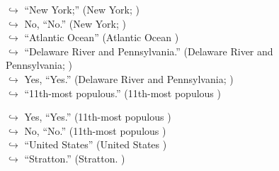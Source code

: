 \documentclass[11pt,a4paper, onecolumn]{article}
\begin{document}
\begin{figure}[t]
\begin{tcolorbox}[boxsep=0pt,left=5pt,right=0pt,top=2pt,colback = yellow!5]
\begin{dialogue}
\colorbox{pink!25}{$\hookrightarrow$}
{ ``New York;'' (New York; ) }
\\
\colorbox{pink!25}{$\hookrightarrow$}
\colorbox{red!25}{No,}
{ ``No.'' (New York; ) }
\\
\colorbox{pink!25}{$\hookrightarrow$}
{ ``Atlantic Ocean'' (Atlantic Ocean ) }
\\
\colorbox{pink!25}{$\hookrightarrow$}
{ ``Delaware River and Pennsylvania.'' (Delaware River and Pennsylvania; ) }
\\
\colorbox{pink!25}{$\hookrightarrow$}
\colorbox{red!25}{Yes,}
{ ``Yes.'' (Delaware River and Pennsylvania; ) }
\\
\colorbox{pink!25}{$\hookrightarrow$}
{ ``11th-most populous.'' (11th-most populous ) }
 \end{dialogue}\end{tcolorbox}\end{figure}\begin{figure}[t] \small \begin{tcolorbox}[boxsep=0pt,left=5pt,right=0pt,top=2pt,colback = yellow!5] \begin{dialogue}
 \small 
\colorbox{pink!25}{$\hookrightarrow$}
\colorbox{red!25}{Yes,}
{ ``Yes.'' (11th-most populous ) }
\\
\colorbox{pink!25}{$\hookrightarrow$}
\colorbox{red!25}{No,}
{ ``No.'' (11th-most populous ) }
\\
\colorbox{pink!25}{$\hookrightarrow$}
{ ``United States'' (United States ) }
\\
\colorbox{pink!25}{$\hookrightarrow$}
{ ``Stratton.'' (Stratton. ) }
\\
 \end{dialogue}\end{tcolorbox}\end{figure}
\end{document}
